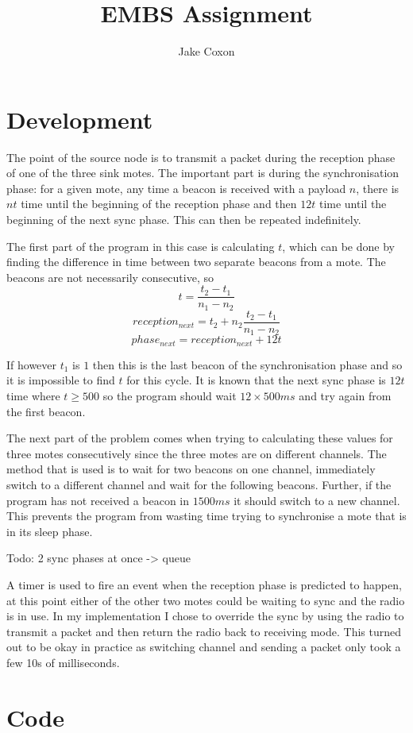 \documentclass{report}
\begin{document}
\title{EMBS Assignment}
\author{Jake Coxon}
\maketitle

\section{Development}

The point of the source node is to transmit a packet during the reception phase of one of the three sink motes. The important part is during the synchronisation phase: for a given mote, any time a beacon is received with a payload $n$, there is $n t$ time until the beginning of the reception phase and then $12 t$ time until the beginning of the next sync phase. This can then be repeated indefinitely.

The first part of the program in this case is calculating $t$, which can be done by finding the difference in time between two separate beacons from a mote. The beacons are not necessarily consecutive, so 
\[t = \frac{t_2 - t_1}{n_1 - n_2}\]
\[reception_{next} = t_2 + n_2 \frac{t_2 - t_1}{n_1 - n_2}\]
\[phase_{next} = reception_{next} + 12 t\]

If however $t_1$ is $1$ then this is the last beacon of the synchronisation phase and so it is impossible to find $t$ for this cycle. It is known that the next sync phase is $12 t$ time where $t \ge 500$ so the program should wait $12 \times 500ms$ and try again from the first beacon.

The next part of the problem comes when trying to calculating these values for three motes consecutively since the three motes are on different channels. The method that is used is to wait for two beacons on one channel, immediately switch to a different channel and wait for the following beacons. Further, if the program has not received a beacon in $1500ms$ it should switch to a new channel. This prevents the program from wasting time trying to synchronise a mote that is in its sleep phase.

Todo: 2 sync phases at once -> queue

A timer is used to fire an event when the reception phase is predicted to happen, at this point either of the other two motes could be waiting to sync and the radio is in use. In my implementation I chose to override the sync by using the radio to transmit a packet and then return the radio back to receiving mode. This turned out to be okay in practice as switching channel and sending a packet only took a few 10s of milliseconds.


\section{Code}


\end{document}
